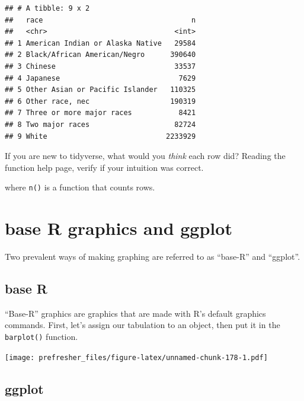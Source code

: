 \documentclass[]{book}
\newenvironment{Shaded}{\begin{snugshade}}{\end{snugshade}}
\newcommand{\KeywordTok}[1]{\textcolor[rgb]{0.13,0.29,0.53}{\textbf{#1}}}
\newcommand{\NormalTok}[1]{#1}
\newcommand{\OperatorTok}[1]{\textcolor[rgb]{0.81,0.36,0.00}{\textbf{#1}}}
\theoremstyle{definition}
\theoremstyle{definition}
\theoremstyle{definition}
\theoremstyle{remark}
\begin{document}
\begin{verbatim}
## # A tibble: 9 x 2
##   race                                   n
##   <chr>                              <int>
## 1 American Indian or Alaska Native   29584
## 2 Black/African American/Negro      390640
## 3 Chinese                            33537
## 4 Japanese                            7629
## 5 Other Asian or Pacific Islander   110325
## 6 Other race, nec                   190319
## 7 Three or more major races           8421
## 8 Two major races                    82724
## 9 White                            2233929
\end{verbatim}

If you are new to tidyverse, what would you \emph{think} each row did? Reading the function help page, verify if your intuition was correct.

where \texttt{n()} is a function that counts rows.

\hypertarget{base-r-graphics-and-ggplot}{%
\section{base R graphics and ggplot}\label{base-r-graphics-and-ggplot}}

Two prevalent ways of making graphing are referred to as ``base-R'' and ``ggplot''.

\hypertarget{base-r}{%
\subsection{base R}\label{base-r}}

``Base-R'' graphics are graphics that are made with R's default graphics commands. First, let's assign our tabulation to an object,
then put it in the \texttt{barplot()} function.

\begin{Shaded}
\end{Shaded}

\texttt{[image: prefresher\_files/figure-latex/unnamed-chunk-178-1.pdf]}

\hypertarget{ggplot}{%
\subsection{ggplot}\label{ggplot}}
\end{document}
